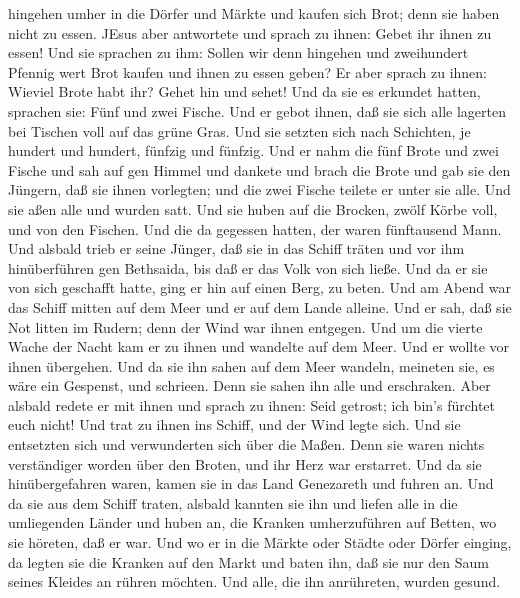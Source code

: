 hingehen umher in die Dörfer und Märkte und kaufen sich Brot; denn sie
haben nicht zu essen.  JEsus aber antwortete und sprach zu
ihnen: Gebet ihr ihnen zu essen! Und sie sprachen zu ihm: Sollen wir
denn hingehen und zweihundert Pfennig wert Brot kaufen und ihnen zu
essen geben?  Er aber sprach zu ihnen: Wieviel Brote habt
ihr? Gehet hin und sehet! Und da sie es erkundet hatten, sprachen sie:
Fünf und zwei Fische.  Und er gebot ihnen, daß sie sich
alle lagerten bei Tischen voll auf das grüne Gras.  Und sie
setzten sich nach Schichten, je hundert und hundert, fünfzig und
fünfzig.  Und er nahm die fünf Brote und zwei Fische und
sah auf gen Himmel und dankete und brach die Brote und gab sie den
Jüngern, daß sie ihnen vorlegten; und die zwei Fische teilete er unter
sie alle.  Und sie aßen alle und wurden satt. 
Und sie huben auf die Brocken, zwölf Körbe voll, und von den Fischen.
 Und die da gegessen hatten, der waren fünftausend Mann.
 Und alsbald trieb er seine Jünger, daß sie in das Schiff
träten und vor ihm hinüberführen gen Bethsaida, bis daß er das Volk von
sich ließe.  Und da er sie von sich geschafft hatte, ging
er hin auf einen Berg, zu beten.  Und am Abend war das
Schiff mitten auf dem Meer und er auf dem Lande alleine. 
Und er sah, daß sie Not litten im Rudern; denn der Wind war ihnen
entgegen. Und um die vierte Wache der Nacht kam er zu ihnen und wandelte
auf dem Meer.  Und er wollte vor ihnen übergehen. Und da
sie ihn sahen auf dem Meer wandeln, meineten sie, es wäre ein Gespenst,
und schrieen.  Denn sie sahen ihn alle und erschraken. Aber
alsbald redete er mit ihnen und sprach zu ihnen: Seid getrost; ich bin's
fürchtet euch nicht!  Und trat zu ihnen ins Schiff, und der
Wind legte sich. Und sie entsetzten sich und verwunderten sich über die
Maßen.  Denn sie waren nichts verständiger worden über den
Broten, und ihr Herz war erstarret.  Und da sie
hinübergefahren waren, kamen sie in das Land Genezareth und fuhren an.
 Und da sie aus dem Schiff traten, alsbald kannten sie ihn
 und liefen alle in die umliegenden Länder und huben an,
die Kranken umherzuführen auf Betten, wo sie höreten, daß er war.
 Und wo er in die Märkte oder Städte oder Dörfer einging,
da legten sie die Kranken auf den Markt und baten ihn, daß sie nur den
Saum seines Kleides an rühren möchten. Und alle, die ihn anrühreten,
wurden gesund.

